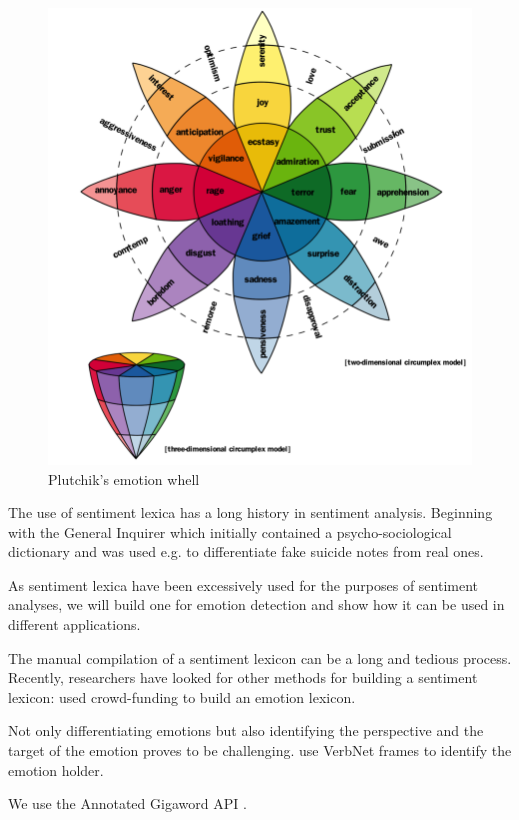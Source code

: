 \citeauthor{sentiment_analysis_association_metrics}


\begin{figure}[bth]
\includegraphics[width=.80\linewidth]{gfx/plutchik_wheel_emotion.png}
\caption{Plutchik's emotion whell}\label{fig:plutchik}
\end{figure}

The use of sentiment lexica has a long history in sentiment analysis. Beginning with the General Inquirer which initially contained a psycho-sociological dictionary and was used e.g. to differentiate fake suicide notes from real ones. \cite{stone_al_general_inquirer}



As sentiment lexica have been excessively used for the purposes of sentiment analyses, we will build one for emotion detection and show how it can be used in different applications.

The manual compilation of a sentiment lexicon can be a long and tedious process. Recently, researchers have looked for other methods for building a sentiment lexicon: 
\citeauthor{mohammad_crowdsource_sentiment_lexicon} used crowd-funding to build an emotion lexicon.

Not only differentiating emotions but also identifying the perspective and the target of the emotion proves to be challenging. \citeauthor{das_emotion_holder} use VerbNet frames to identify the emotion holder.

We use the Annotated Gigaword API \cite{napoles_al_annotated_gigaword}.

